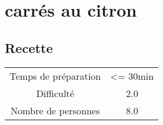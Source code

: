 \newpage
\section{carrés au citron}
    \label{sec:carrés au citron}
    \subsection{Recette}
    \vspace{1cm}


    \begin{center}
        \begin{tabular}{c|c}
            Temps de préparation & <= 30min \\
            Difficulté & 2.0 \\
            Nombre de personnes & 8.0 
        \end{tabular}
    \end{center}{}

    \vspace{1cm}
    \hline
    \vspace{1cm}


